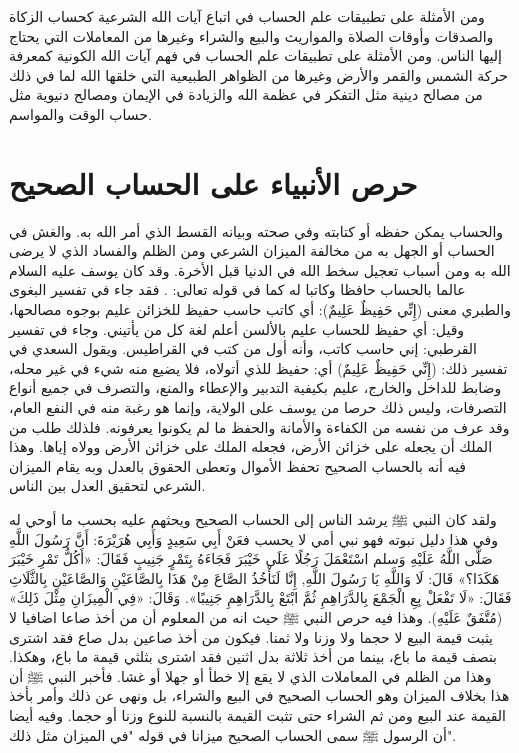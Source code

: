 ومن الأمثلة على تطبيقات علم الحساب في اتباع آيات الله الشرعية كحساب الزكاة والصدقات وأوقات الصلاة والمواريث والبيع والشراء وغيرها من المعاملات التي يحتاج إليها الناس.  ومن الأمثلة على تطبيقات علم الحساب في فهم آيات الله الكونية كمعرفة حركة الشمس والقمر والأرض وغيرها من الظواهر الطبيعية التي خلقها الله لما في ذلك من مصالح دينية مثل التفكر في عظمة الله والزيادة في الإيمان ومصالح دنيوية مثل حساب الوقت والمواسم.

\section{حرص الأنبياء على الحساب الصحيح}

والحساب يمكن حفظه أو كتابته وفي صحته وبيانه القسط الذي أمر الله به. والغش في الحساب أو الجهل به من مخالفة الميزان الشرعي ومن الظلم والفساد الذي لا يرضى الله به ومن أسباب تعجيل سخط الله في الدنيا قبل الأخرة. وقد كان يوسف عليه السلام عالما بالحساب حافظا وكاتبا له كما في قوله تعالى: \quranayah*[12][55]{\footnotesize \surahname*[12]}. فقد جاء في تفسير البغوى والطبري معنى (إِنِّي حَفِيظٌ عَلِيمٌ): أي كاتب حاسب حفيظ للخزائن عليم بوجوه مصالحها، وقيل: أي حفيظ للحساب عليم بالألسن أعلم لغة كل من يأتيني. وجاء في تفسير القرطبي: إني حاسب كاتب، وأنه أول من كتب في القراطيس. ويقول السعدي في تفسير ذلك: (إِنِّي حَفِيظٌ عَلِيمٌ) أي: حفيظ للذي أتولاه، فلا يضيع منه شيء في غير محله، وضابط للداخل والخارج، عليم بكيفية التدبير والإعطاء والمنع، والتصرف في جميع أنواع التصرفات، وليس ذلك حرصا من يوسف على الولاية، وإنما هو رغبة منه في النفع العام، وقد عرف من نفسه من الكفاءة والأمانة والحفظ ما لم يكونوا يعرفونه. فلذلك طلب من الملك أن يجعله على خزائن الأرض، فجعله الملك على خزائن الأرض وولاه إياها. \href{https://shamela.ws/book/42/841#p5}{\faExternalLink} \cite{tafsir_Saadi} وهذا فيه أنه بالحساب الصحيح تحفظ الأموال وتعطى الحقوق بالعدل وبه يقام الميزان الشرعي لتحقيق العدل بين الناس.

ولقد كان النبي ﷺ يرشد الناس إلى الحساب الصحيح ويحثهم عليه بحسب ما أوحي له وفي هذا دليل نبوته فهو نبي أمي لا يحسب فعَنْ أَبِي سَعِيدٍ وَأَبِي هُرَيْرَةَ: أَنَّ رَسُولَ اللَّهِ صَلَّى اللَّهُ عَلَيْهِ وَسلم اسْتَعْمَلَ رَجُلًا عَلَى خَيْبَرَ فَجَاءَهُ بِتَمْرٍ جَنِيبٍ فَقَالَ: «أَكُلُّ تَمْرِ خَيْبَرَ هَكَذَا؟» قَالَ: لَا وَاللَّهِ يَا رَسُولَ اللَّهِ, إِنَّا لَنَأْخُذُ الصَّاعَ مِنْ هَذَا بِالصَّاعَيْنِ وَالصَّاعَيْنِ بِالثَّلَاثِ فَقَالَ: «لَا تَفْعَلْ بِعِ الْجَمْعَ بِالدَّرَاهِمِ ثُمَّ ابْتَعْ بِالدَّرَاهِمِ جَنِيبًا». وَقَالَ: «فِي الْمِيزَانِ مِثْلَ ذَلِكَ» {\footnotesize (مُتَّفَقٌ عَلَيْهِ)}.
وهذا فيه حرص النبي ﷺ حيث انه من المعلوم أن من أخذ صاعا اضافيا لا يثبت قيمة البيع لا حجما ولا وزنا ولا ثمنا. فيكون من أخذ صاعين بدل صاع فقد اشترى بنصف قيمة ما باع، بينما من أخذ ثلاثة بدل اثنين فقد اشترى بثلثي قيمة ما باع، وهكذا. وهذا من الظلم في المعاملات الذي لا يقع إلا خطأ أو جهلا أو غشا. فأخبر النبي ﷺ أن هذا بخلاف الميزان وهو الحساب الصحيح في البيع والشراء، بل ونهى عن ذلك وأمر بأخذ القيمة عند البيع ومن ثم الشراء حتى تثبت القيمة بالنسبة للنوع وزنا أو حجما. وفيه أيضا أن الرسول ﷺ سمى الحساب الصحيح ميزانا في قوله "في الميزان مثل ذلك". 

